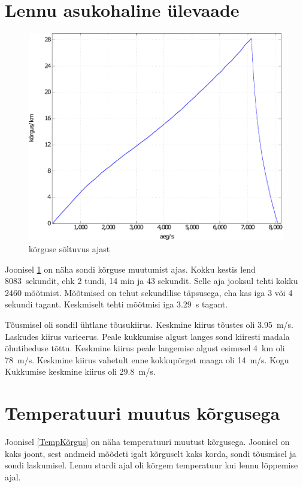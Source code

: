 \documentclass{trkut}%
\begin{document}
\section{Lennu asukohaline ülevaade}

\begin{figure}[h]
	\includegraphics[width=1\textwidth]{PicGra/kõraeg.pdf}
	\caption{kõrguse sõltuvus ajast}
	\label{kõraeg}
\end{figure}

Joonisel \ref{kõraeg} on näha sondi kõrguse muutumist ajas. Kokku kestis lend \SI{8083}{sekundit}, ehk 2 tundi, 14 min ja 43 sekundit. Selle aja jooksul tehti kokku 2460 mõõtmist. Mõõtmised on tehut sekundilise täpsusega, eha kas iga 3 või 4 sekundi tagant. Keskmiselt tehti mõõtmisi iga \SI{3.29}{s} tagant.

Tõusmisel oli sondil ühtlane tõusukiirus. Keskmine kiirus tõustes oli \SI{3.95}{m/s}. Laskudes kiirus varieerus. Peale kukkumise algust langes sond kiiresti madala õhutiheduse tõttu. Keskmine kiirus peale langemise algust esimesel \SI{4}{km} oli \SI{78}{m/s}. Keskmine kiirus vahetult enne kokkupõrget maaga oli \SI{14}{m/s}. Kogu Kukkumise keskmine kiirus oli \SI{29.8}{m/s}.

\section{Temperatuuri muutus kõrgusega}
Joonisel \ref{TempKõrgus} on näha temperatuuri muutust kõrgusega. Joonisel on kaks joont, sest andmeid mõõdeti igalt kõrguselt kaks korda, sondi tõusmisel ja sondi laskumisel. Lennu stardi ajal oli kõrgem temperatuur kui lennu lõppemise ajal.
\end{document}
